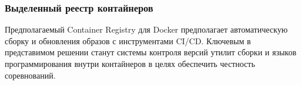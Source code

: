 \subsubsection{Выделенный реестр контайнеров}

Предполагаемый Container Registry для Docker предполагает автоматическую сборку и обновления образов с инструментами CI/CD.
Ключевым в представимом решении станут системы контроля версий утилит сборки и языков программирования внутри контайнеров в целях обеспечить честность соревнований.






